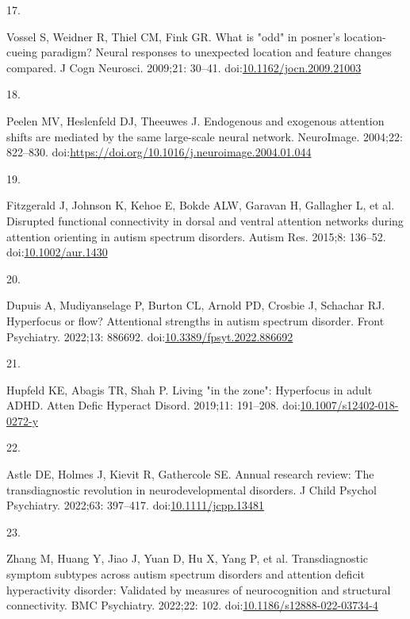 \documentclass[
  letterpaper,
  DIV=11,
  numbers=noendperiod]{scrartcl}
\newlength{\cslhangindent}
\newlength{\csllabelwidth}
\newenvironment{CSLReferences}[2] %
 {\begin{list}{}{%
  \setlength{\itemindent}{0pt}
  \setlength{\leftmargin}{0pt}
  \setlength{\parsep}{0pt}
  \ifodd #1
   \setlength{\leftmargin}{\cslhangindent}
   \setlength{\itemindent}{-1\cslhangindent}
  \fi
  \setlength{\itemsep}{#2\baselineskip}}}
 {\end{list}}
\newcommand{\CSLLeftMargin}[1]{\parbox[t]{\csllabelwidth}{\strut#1\strut}}
\newcommand{\CSLRightInline}[1]{\parbox[t]{\linewidth - \csllabelwidth}{\strut#1\strut}}
\begin{document}
\begin{CSLReferences}{0}{1}
\CSLLeftMargin{17. }%
\CSLRightInline{Vossel S, Weidner R, Thiel CM, Fink GR. What is "odd" in
posner's location-cueing paradigm? Neural responses to unexpected
location and feature changes compared. J Cogn Neurosci. 2009;21: 30--41.
doi:\href{https://doi.org/10.1162/jocn.2009.21003}{10.1162/jocn.2009.21003}}

\CSLLeftMargin{18. }%
\CSLRightInline{Peelen MV, Heslenfeld DJ, Theeuwes J. Endogenous and
exogenous attention shifts are mediated by the same large-scale neural
network. NeuroImage. 2004;22: 822--830.
doi:\url{https://doi.org/10.1016/j.neuroimage.2004.01.044}}

\CSLLeftMargin{19. }%
\CSLRightInline{Fitzgerald J, Johnson K, Kehoe E, Bokde ALW, Garavan H,
Gallagher L, et al. Disrupted functional connectivity in dorsal and
ventral attention networks during attention orienting in autism spectrum
disorders. Autism Res. 2015;8: 136--52.
doi:\href{https://doi.org/10.1002/aur.1430}{10.1002/aur.1430}}

\CSLLeftMargin{20. }%
\CSLRightInline{Dupuis A, Mudiyanselage P, Burton CL, Arnold PD, Crosbie
J, Schachar RJ. Hyperfocus or flow? Attentional strengths in autism
spectrum disorder. Front Psychiatry. 2022;13: 886692.
doi:\href{https://doi.org/10.3389/fpsyt.2022.886692}{10.3389/fpsyt.2022.886692}}

\CSLLeftMargin{21. }%
\CSLRightInline{Hupfeld KE, Abagis TR, Shah P. Living "in the zone":
Hyperfocus in adult ADHD. Atten Defic Hyperact Disord. 2019;11:
191--208.
doi:\href{https://doi.org/10.1007/s12402-018-0272-y}{10.1007/s12402-018-0272-y}}

\CSLLeftMargin{22. }%
\CSLRightInline{Astle DE, Holmes J, Kievit R, Gathercole SE. Annual
research review: The transdiagnostic revolution in neurodevelopmental
disorders. J Child Psychol Psychiatry. 2022;63: 397--417.
doi:\href{https://doi.org/10.1111/jcpp.13481}{10.1111/jcpp.13481}}

\CSLLeftMargin{23. }%
\CSLRightInline{Zhang M, Huang Y, Jiao J, Yuan D, Hu X, Yang P, et al.
Transdiagnostic symptom subtypes across autism spectrum disorders and
attention deficit hyperactivity disorder: Validated by measures of
neurocognition and structural connectivity. BMC Psychiatry. 2022;22:
102.
doi:\href{https://doi.org/10.1186/s12888-022-03734-4}{10.1186/s12888-022-03734-4}}


\end{CSLReferences}
\end{document}
